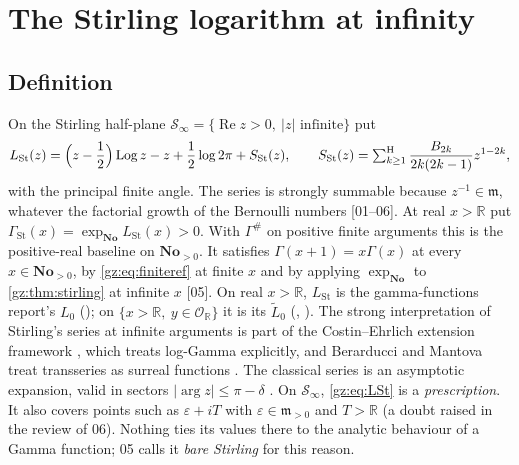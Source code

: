 \documentclass[11pt,a4paper]{article}
\numberwithin{equation}{section}
\theoremstyle{definition}
\theoremstyle{remark}
\newcommand{\No}{\mathbf{No}}
\newcommand{\R}{\mathbb R}
\newcommand{\OO}{\mathcal O}
\newcommand{\mm}{\mathfrak m}
\newcommand{\eps}{\varepsilon}
\renewcommand{\Re}{\operatorname{Re}}
\newcommand{\Log}{\operatorname{Log}}
\newcommand{\Sh}{\mathop{\textstyle\sum}\nolimits^{\mathrm H}}
\newcommand{\LSt}{L_{\mathrm{St}}}
\newcommand{\GSt}{\Gamma_{\mathrm{St}}}
\newcommand{\SSt}{S_{\mathrm{St}}}
\newcommand{\Gp}{\Gamma^{\#}}
\newcommand{\Sinf}{\mathcal S_{\infty}}
\newcommand{\src}[1]{\textup{[#1]}}
\begin{document}
\section{The Stirling logarithm at infinity}\label{gz:sec:stirling}

\subsection{Definition}
On the Stirling half-plane $\Sinf=\{\Re z>0,\ |z|\text{ infinite}\}$ put
\begin{equation}\label{gz:eq:LSt}
\LSt(z)=\Bigl(z-\frac12\Bigr)\Log z-z+\frac12\log2\pi+\SSt(z),\qquad
\SSt(z)=\Sh_{k\ge1}\frac{B_{2k}}{2k(2k-1)}z^{1-2k},
\end{equation}
with the principal finite angle. The series is strongly summable because
$z^{-1}\in\mm$, whatever the factorial growth of the Bernoulli numbers
\src{01--06}. At real $x>\R$ put $\GSt(x)=\exp_{\No}\LSt(x)>0$. With $\Gp$ on
positive finite arguments this is the positive-real baseline on $\No_{>0}$.
It satisfies $\Gamma(x+1)=x\Gamma(x)$ at every $x\in\No_{>0}$, by
\eqref{gz:eq:finiteref} at finite $x$ and by applying $\exp_{\No}$ to
\cref{gz:thm:stirling} at infinite $x$ \src{05}.
On real $x>\R$, $\LSt$ is the gamma-functions report's $L_0$
(); on $\{x>\R,\ y\in\OO_\R\}$ it is its $\widetilde L_0$
(, ). The strong
interpretation of Stirling's series at infinite arguments is part of the
Costin--Ehrlich extension framework \cite{CE}, which treats log-Gamma
explicitly, and Berarducci and Mantova treat transseries as surreal functions \cite{BM}. The classical series is an asymptotic expansion, valid in
sectors $|\arg z|\le\pi-\delta$ \cite{DLMF511}. On $\Sinf$, \eqref{gz:eq:LSt}
is a \emph{prescription}. It also covers points such as
$\eps+iT$ with $\eps\in\mm_{>0}$ and $T>\R$ (a doubt raised in the review
of 06). Nothing ties
its values there to the analytic behaviour of a Gamma function; 05 calls
it \emph{bare Stirling} for this reason.
\end{document}
